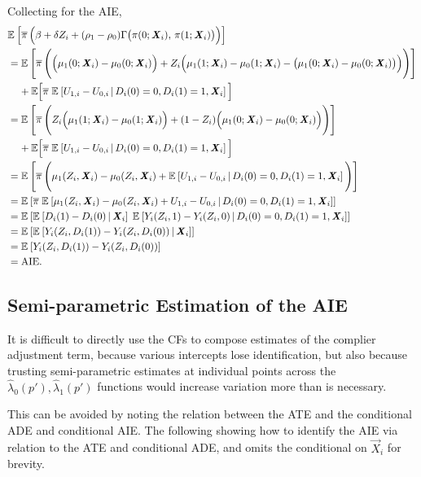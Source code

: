 Collecting for the AIE,
\begin{align*}
    &\mathbb{E}_{} \left[  \overline{\pi} \, \Big( \beta +  \delta Z_i +
        (\rho_1 - \rho_0) \Gamma \big(\pi(0; \boldsymbol{\mathit{X}}_i), \, \pi(1; \boldsymbol{\mathit{X}}_i) \big) \Big)  \right] \\
    &= \mathbb{E}_{} \left[  \overline{\pi} \, \Bigg( \Big( \mu_1(0; \boldsymbol{\mathit{X}}_i) - \mu_0(0; \boldsymbol{\mathit{X}}_i) \Big)
        +  Z_i \Big( \mu_1(1; \boldsymbol{\mathit{X}}_i) - \mu_0(1; \boldsymbol{\mathit{X}}_i)
            - \big(\mu_1(0; \boldsymbol{\mathit{X}}_i) - \mu_0(0; \boldsymbol{\mathit{X}}_i) \big) \Big) \Bigg)  \right] \\
    &\;\;\;\; + \mathbb E \Big[ \overline{\pi} \; \mathbb{E}_{} \left[  U_{1,i} - U_{0,i}  \, \middle\vert \, D_i(0) = 0, D_i(1) = 1, \boldsymbol{\mathit{X}}_i \right] \Big] \\
    &= \mathbb{E}_{} \left[  \overline{\pi} \, \Bigg(
        Z_i \Big( \mu_1(1; \boldsymbol{\mathit{X}}_i) - \mu_0(1; \boldsymbol{\mathit{X}}_i) \Big)
        + (1 - Z_i) \Big( \mu_1(0; \boldsymbol{\mathit{X}}_i) - \mu_0(0; \boldsymbol{\mathit{X}}_i) \Big) \Bigg)  \right] \\
    &\;\;\;\; + \mathbb E \Big[ \overline{\pi} \; \mathbb{E}_{} \left[  U_{1,i} - U_{0,i}  \, \middle\vert \, D_i(0) = 0, D_i(1) = 1, \boldsymbol{\mathit{X}}_i \right] \Big] \\
    &= \mathbb{E}_{} \left[  \overline{\pi} \, \Bigg(
        \mu_1(Z_i, \boldsymbol{\mathit{X}}_i) - \mu_0(Z_i, \boldsymbol{\mathit{X}}_i)
        + \mathbb{E}_{} \left[  U_{1,i} - U_{0,i}  \, \middle\vert \, D_i(0) = 0, D_i(1) = 1, \boldsymbol{\mathit{X}}_i \right] \Bigg)  \right] \\
    &= \mathbb{E}_{} \left[  \overline{\pi} \; \mathbb{E}_{} \left[ 
        \mu_1(Z_i, \boldsymbol{\mathit{X}}_i) - \mu_0(Z_i, \boldsymbol{\mathit{X}}_i) + U_{1,i} - U_{0,i}  \, \middle\vert \, 
            D_i(0) = 0, D_i(1) = 1, \boldsymbol{\mathit{X}}_i \right]  \right] \\
    &= \mathbb{E}_{} \left[  \mathbb{E}_{} \left[ D_i(1) - D_i(0) \, \middle\vert \, \boldsymbol{\mathit{X}}_i \right] \; \mathbb{E}_{} \left[ 
        Y_i(Z_i, 1) - Y_i(Z_i, 0)  \, \middle\vert \,  D_i(0) = 0, D_i(1) = 1, \boldsymbol{\mathit{X}}_i \right]  \right] \\
    &= \mathbb{E}_{} \left[  \mathbb{E}_{} \left[ Y_i(Z_i,D_i(1)) - Y_i(Z_i,D_i(0)) \, \middle\vert \, \boldsymbol{\mathit{X}}_i \right]  \right] \\
    &= \mathbb{E}_{} \left[  Y_i(Z_i,D_i(1)) - Y_i(Z_i,D_i(0))  \right] \\
    &= \text{AIE}.
\end{align*}

\subsection{Semi-parametric Estimation of the AIE}
\label{appendix:semi-parametric}
It is difficult to directly use the CFs to compose estimates of the complier adjustment term, because various intercepts lose identification, but also because trusting semi-parametric estimates at individual points across the $\hat\lambda_0(p'), \hat\lambda_1(p')$ functions would increase variation more than is necessary.

This can be avoided by noting the relation between the ATE and the conditional ADE and conditional AIE.
The following showing how to identify the AIE via relation to the ATE and conditional ADE, and omits the conditional on $\vec X_i$ for brevity. 

